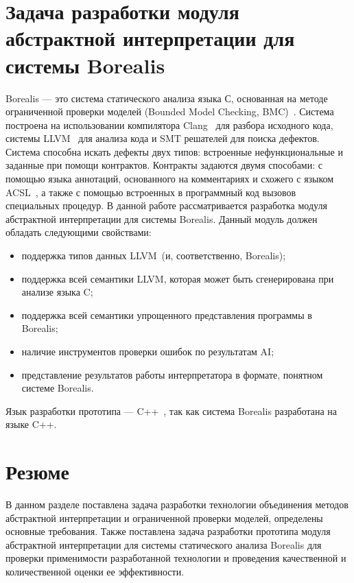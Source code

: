 \section{Задача разработки модуля абстрактной интерпретации для системы 
Borealis}
Borealis --- это система статического анализа языка С, основанная на методе 
ограниченной проверки моделей (Bounded Model Checking, BMC)~\cite{borealis}. Система 
построена на использовании компилятора Clang~\cite{clang} для разбора исходного 
кода, системы LLVM~\cite{llvm} для анализа кода и SMT решателей для поиска 
дефектов. Система способна искать дефекты двух типов: встроенные 
нефункциональные и заданные при помощи контрактов. Контракты задаются двумя 
способами: с помощью языка аннотаций, основанного на комментариях и схожего с 
языком ACSL~\cite{acsl}, а также с помощью встроенных в программный код вызовов специальных 
процедур. В данной работе рассматривается разработка модуля абстрактной 
интерпретации для системы Borealis. Данный модуль должен обладать следующими
свойствами:
\begin{itemize}
\item поддержка типов данных LLVM~(и, соответственно, Borealis);
\item поддержка всей семантики LLVM, которая может быть сгенерирована при 
анализе языка C;
\item поддержка всей семантики упрощенного представления программы в Borealis;
\item наличие инструментов проверки ошибок по результатам AI;
\item представление результатов работы интерпретатора в формате, понятном 
системе Borealis.
\end{itemize}

Язык разработки прототипа --- C++~\cite{languageC++}, так как система Borealis 
разработана на языке C++.

\section{Резюме}
В данном разделе поставлена задача разработки технологии объединения методов
абстрактной интерпретации и ограниченной проверки моделей, определены основные 
требования. Также поставлена задача разработки прототипа модуля абстрактной
интерпретации для системы статического анализа Borealis для проверки 
применимости разработанной технологии и проведения качественной и 
количественной оценки ее эффективности.